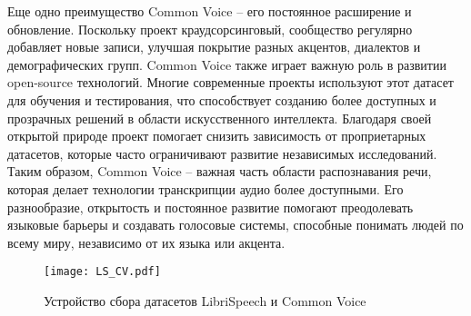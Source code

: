 Еще одно преимущество Common Voice -- его постоянное расширение и обновление. Поскольку проект краудсорсинговый, сообщество регулярно добавляет новые записи, улучшая покрытие разных акцентов, диалектов и демографических групп.
Common Voice также играет важную роль в развитии open-source технологий.
Многие современные проекты используют этот датасет для обучения и тестирования, что способствует созданию более доступных и прозрачных решений в области искусственного интеллекта.
Благодаря своей открытой природе проект помогает снизить зависимость от проприетарных датасетов, которые часто ограничивают развитие независимых исследований.
Таким образом, Common Voice -- важная часть области распознавания речи, которая делает технологии транскрипции аудио более доступными.
Его разнообразие, открытость и постоянное развитие помогают преодолевать языковые барьеры и создавать голосовые системы, способные понимать людей по всему миру, независимо от их языка или акцента.

\begin{figure}[!t]
  \centering
  \texttt{[image: LS\_CV.pdf]}
  \caption{Устройство сбора датасетов LibriSpeech и Common Voice}
  \label{fig:ls_cv}
\end{figure}


